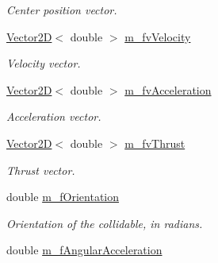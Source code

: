 \begin{DoxyCompactItemize}
\begin{DoxyCompactList}\small\item\em Center position vector. \end{DoxyCompactList}\item 
\hypertarget{class_collidable_a3a46aab76b8a8651ca93f601f62c05fd}{}\hyperlink{class_vector2_d}{Vector2\+D}$<$ double $>$ \hyperlink{class_collidable_a3a46aab76b8a8651ca93f601f62c05fd}{m\+\_\+fv\+Velocity}\label{class_collidable_a3a46aab76b8a8651ca93f601f62c05fd}

\begin{DoxyCompactList}\small\item\em Velocity vector. \end{DoxyCompactList}\item 
\hypertarget{class_collidable_a43efbe42453578169f73f0b34cacc80c}{}\hyperlink{class_vector2_d}{Vector2\+D}$<$ double $>$ \hyperlink{class_collidable_a43efbe42453578169f73f0b34cacc80c}{m\+\_\+fv\+Acceleration}\label{class_collidable_a43efbe42453578169f73f0b34cacc80c}

\begin{DoxyCompactList}\small\item\em Acceleration vector. \end{DoxyCompactList}\item 
\hypertarget{class_collidable_ad88d617204dde9a1abc37e013e7c3d51}{}\hyperlink{class_vector2_d}{Vector2\+D}$<$ double $>$ \hyperlink{class_collidable_ad88d617204dde9a1abc37e013e7c3d51}{m\+\_\+fv\+Thrust}\label{class_collidable_ad88d617204dde9a1abc37e013e7c3d51}

\begin{DoxyCompactList}\small\item\em Thrust vector. \end{DoxyCompactList}\item 
\hypertarget{class_collidable_af9cea5a59438b7b3604b8c7aa023380f}{}double \hyperlink{class_collidable_af9cea5a59438b7b3604b8c7aa023380f}{m\+\_\+f\+Orientation}\label{class_collidable_af9cea5a59438b7b3604b8c7aa023380f}

\begin{DoxyCompactList}\small\item\em Orientation of the collidable, in radians. \end{DoxyCompactList}\item 
\hypertarget{class_collidable_a376aa200ba174a1cea17766fbcbda760}{}double \hyperlink{class_collidable_a376aa200ba174a1cea17766fbcbda760}{m\+\_\+f\+Angular\+Acceleration}\label{class_collidable_a376aa200ba174a1cea17766fbcbda760}


\end{DoxyCompactItemize}
